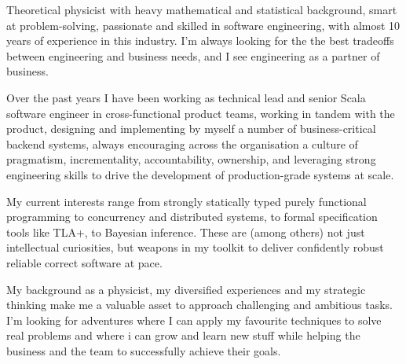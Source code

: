 
\begin{cvparagraph}
Theoretical physicist with heavy mathematical and statistical 
background, smart at problem-solving, passionate and skilled in software engineering, with almost 10 years of experience in this industry. 
I'm always looking for the the best tradeoffs between engineering and business needs, and I see engineering as a partner of business. 

  Over the past years I have been working as technical lead and senior Scala software engineer in cross-functional product teams, working in tandem with the product, designing and implementing by myself a number of business-critical backend systems, always encouraging across the organisation a culture of pragmatism, incrementality, accountability, ownership, and leveraging strong engineering skills 
  to drive the development of production-grade systems at scale. 

  My current interests range from strongly statically typed purely functional programming to concurrency and distributed systems, to formal specification tools like TLA+, to Bayesian inference. These are (among others) not just intellectual curiosities, but weapons in my toolkit to deliver confidently robust reliable correct software at pace. 

My background as a physicist, my diversified experiences and my strategic thinking make me a valuable asset to approach challenging and ambitious tasks. I'm looking for adventures where I can apply my favourite techniques to solve real problems and where i can grow and learn new stuff while helping the business and the team to successfully achieve their goals. 
\end{cvparagraph}
